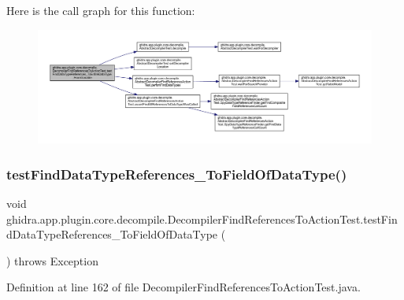 Here is the call graph for this function\+:
\nopagebreak
\begin{figure}[H]
\begin{center}
\leavevmode
\includegraphics[width=350pt]{classghidra_1_1app_1_1plugin_1_1core_1_1decompile_1_1_decompiler_find_references_to_action_test_a242ce02c89f1f674a753ca16a1977111_cgraph}
\end{center}
\end{figure}
\mbox{\label{classghidra_1_1app_1_1plugin_1_1core_1_1decompile_1_1_decompiler_find_references_to_action_test_a303f1a21bc0949e92a7b9793d7a56a73}} 
\subsubsection{\texorpdfstring{testFindDataTypeReferences\_ToFieldOfDataType()}{testFindDataTypeReferences\_ToFieldOfDataType()}}
{\footnotesize\ttfamily void ghidra.\+app.\+plugin.\+core.\+decompile.\+Decompiler\+Find\+References\+To\+Action\+Test.\+test\+Find\+Data\+Type\+References\+\_\+\+To\+Field\+Of\+Data\+Type (\begin{DoxyParamCaption}{ }\end{DoxyParamCaption}) throws Exception\hspace{0.3cm}{\ttfamily [inline]}}



Definition at line 162 of file Decompiler\+Find\+References\+To\+Action\+Test.\+java.

